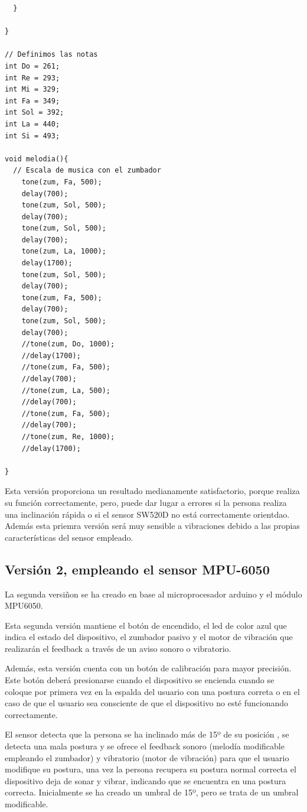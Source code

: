 \begin{lstlisting}
  }

}

// Definimos las notas
int Do = 261;
int Re = 293;
int Mi = 329;
int Fa = 349;
int Sol = 392;
int La = 440;
int Si = 493;

void melodia(){
  // Escala de musica con el zumbador
    tone(zum, Fa, 500);
    delay(700);
    tone(zum, Sol, 500);
    delay(700);
    tone(zum, Sol, 500);
    delay(700);
    tone(zum, La, 1000);
    delay(1700);
    tone(zum, Sol, 500);
    delay(700);
    tone(zum, Fa, 500);
    delay(700);
    tone(zum, Sol, 500);
    delay(700);
    //tone(zum, Do, 1000);
    //delay(1700);
    //tone(zum, Fa, 500);
    //delay(700);
    //tone(zum, La, 500);
    //delay(700);
    //tone(zum, Fa, 500);
    //delay(700);
    //tone(zum, Re, 1000);
    //delay(1700);
    
}

\end{lstlisting}

Esta versión proporciona un resultado medianamente satisfactorio, porque realiza su función correctamente, pero, puede dar lugar a errores si la persona realiza una inclinación rápida o si el sensor SW520D no está correctamente orientdao. Además esta priemra versión será muy sensible a vibraciones debido a las propias características del sensor empleado.

\subsection{Versión 2, empleando el sensor MPU-6050}

La segunda versiñon se ha creado  en base al microprocesador arduino y el módulo MPU6050.

Esta segunda versión mantiene el botón de encendido, el led de color azul que indica el estado del dispositivo, el zumbador pasivo y el motor de vibración que realizarán el feedback a través de un aviso sonoro o vibratorio.

Además, esta versión cuenta con un botón de calibración para mayor precisión. Este botón deberá presionarse cuando el dispositivo se encienda cuando se coloque por primera vez en la espalda del usuario con una postura correta o en el caso de que el usuario sea consciente de que el dispositivo no esté funcionando correctamente.  

El sensor detecta que la persona se ha inclinado más de 15º de su posición , se detecta una mala postura y se ofrece el feedback sonoro (melodía modificable empleando el zumbador) y vibratorio (motor de vibración) para que el usuario modifique su postura, una vez la persona recupera su postura normal correcta el dispositivo deja de sonar y vibrar, indicando que se encuentra en una postura correcta. Inicialmente se ha creado un umbral de 15º, pero se trata de un umbral modificable.

